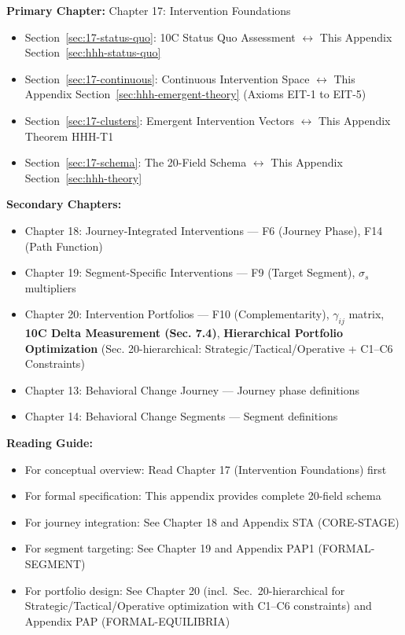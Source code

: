 \begin{tcolorbox}[colback=purple!5!white, colframe=purple!75!black,
    title=Chapter Linkage]

\textbf{Primary Chapter:} Chapter 17: Intervention Foundations
\begin{itemize}[nosep]
\item Section~\ref{sec:17-status-quo}: 10C Status Quo Assessment $\leftrightarrow$ This Appendix Section~\ref{sec:hhh-status-quo}
\item Section~\ref{sec:17-continuous}: Continuous Intervention Space $\leftrightarrow$ This Appendix Section~\ref{sec:hhh-emergent-theory} (Axioms EIT-1 to EIT-5)
\item Section~\ref{sec:17-clusters}: Emergent Intervention Vectors $\leftrightarrow$ This Appendix Theorem HHH-T1
\item Section~\ref{sec:17-schema}: The 20-Field Schema $\leftrightarrow$ This Appendix Section~\ref{sec:hhh-theory}
\end{itemize}

\textbf{Secondary Chapters:}
\begin{itemize}[nosep]
\item Chapter 18: Journey-Integrated Interventions --- F6 (Journey Phase), F14 (Path Function)
\item Chapter 19: Segment-Specific Interventions --- F9 (Target Segment), $\sigma_s$ multipliers
\item Chapter 20: Intervention Portfolios --- F10 (Complementarity), $\gamma_{ij}$ matrix, \textbf{10C Delta Measurement (Sec. 7.4)}, \textbf{Hierarchical Portfolio Optimization} (Sec. 20-hierarchical: Strategic/Tactical/Operative + C1--C6 Constraints)
\item Chapter 13: Behavioral Change Journey --- Journey phase definitions
\item Chapter 14: Behavioral Change Segments --- Segment definitions
\end{itemize}

\textbf{Reading Guide:}
\begin{itemize}[nosep]
\item For conceptual overview: Read Chapter 17 (Intervention Foundations) first
\item For formal specification: This appendix provides complete 20-field schema
\item For journey integration: See Chapter 18 and Appendix STA (CORE-STAGE)
\item For segment targeting: See Chapter 19 and Appendix PAP1 (FORMAL-SEGMENT)
\item For portfolio design: See Chapter 20 (incl.\ Sec.\ 20-hierarchical for Strategic/Tactical/Operative optimization with C1--C6 constraints) and Appendix PAP (FORMAL-EQUILIBRIA)
\end{itemize}

\end{tcolorbox}

